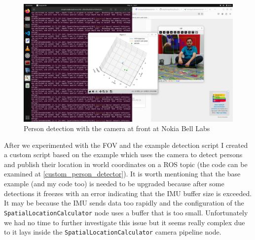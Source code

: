 \begin{figure}[H]
    \centering
    \includegraphics[width=150mm, keepaspectratio]{figures/person_detection_camera_at_front_nokia.png}
    \caption{Person detection with the camera at front at Nokia Bell Labs}
    \label{fig:person_detection_camera_at_front_nokia}
\end{figure}

After we experimented with the FOV and the example detection script I created a custom script based on the example which uses the camera to detect persons and publish their location in world coordinates on a ROS topic (the code can be examined at \ref{custom_person_detector}). It is worth mentioning that the base example (and my code too) is needed to be upgraded because after some detections it freezes with an error indicating that the IMU buffer size is exceeded. It may be because the IMU sends data too rapidly and the configuration of the \verb|SpatialLocationCalculator| node uses a buffer that is too small. Unfortunately we had no time to further investigate this issue but it seems really complex due to it lays inside the \verb|SpatialLocationCalculator| camera pipeline node.
